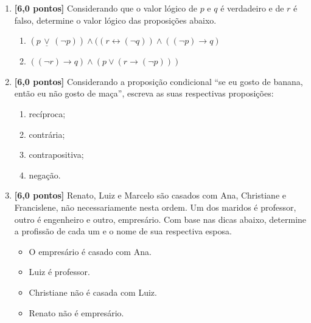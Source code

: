 \documentclass[12pt,a4paper]{article}
\begin{document}
\begin{enumerate}
  \item \textbf{[6,0 pontos]} Considerando que o valor lógico de $p$ e $q$ é verdadeiro e de $r$ é falso, determine o 
    valor lógico das proposições abaixo.

    \begin{enumerate}
      \item $(p \,\underline{\vee}\, (\lnot p))\wedge ((r \leftrightarrow (\lnot q))\wedge ((\lnot p)\rightarrow q)$
      \item $((\lnot r)\rightarrow q) \wedge (p \vee (r \rightarrow (\lnot p)))$
    \end{enumerate}

  \item \textbf{[6,0 pontos]} Considerando a proposição condicional ``se eu gosto de banana, então eu não gosto de maça'', escreva 
  as suas respectivas proposições:

    \begin{enumerate}
      \item recíproca;
      \item contrária;
      \item contrapositiva;
      \item negação.
    \end{enumerate}

  \item \textbf{[6,0 pontos]} Renato, Luiz e Marcelo são casados com Ana, Christiane e Francislene, não necessariamente nesta ordem. 
    Um dos maridos é professor, outro é engenheiro e outro, empresário. Com base nas dicas abaixo, determine 
    a profissão de cada um e o nome de sua respectiva esposa.
    
  \begin{itemize}
    \item O empresário é casado com Ana.
    \item Luiz é professor.
    \item Christiane não é casada com Luiz.
    \item Renato não é empresário.
  \end{itemize}

\end{enumerate}
\end{document}
